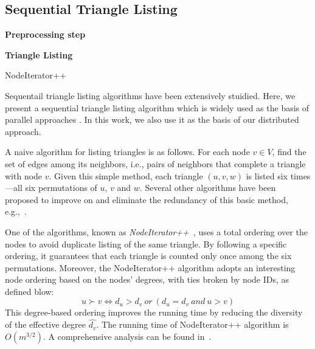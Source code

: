 \subsection{Sequential Triangle Listing}
\label{sec:InMemoryAlgorithms}
\begin{algorithm}[t]
    \begin{algorithmic}[1]
        \item[] {\textbf{Preprocessing step}} 
         \ENDFOR
        \item[] {\textbf{Triangle Listing}}
                 \ENDFOR
            \ENDFOR
        \ENDFOR
    \caption{NodeIterator++}
    \label{alg:Node}
    \end{algorithmic}
\end{algorithm}
Sequentail triangle listing algorithms have been extensively stuidied. Here, we present a sequential triangle listing algorithm which is widely used as the basis of parallel approaches \cite{Suri_Vassilvitskii_2011,Patric,parkmapreduce2014}. In this work, we also use it as the basis of our distributed approach. 

A naive algorithm for listing triangles is as follows. For each node $v \in V$, find the set of edges among its neighbors, i.e., pairs of neighbors that complete a triangle with node $v$. Given  this simple method, each triangle $(u,v,w)$ is listed six times---all six permutations of $u$, $v$ and $w$. Several other algorithms have been proposed to improve on and eliminate the redundancy of this basic method, e.g.,~\cite{Schank_2007,Becchetti_Boldi_Castillo_Gionis_2008}.

One of the algorithms, known as \emph{NodeIterator++}~\cite{Schank_2007}, uses a total ordering over the nodes to avoid duplicate listing of the same triangle. By following a specific ordering, it guarantees  that each triangle is counted only once among the six permutations. Moreover, the NodeIterator++ algorithm  adopts an interesting node ordering based on the nodes'  degrees, with ties broken by node IDs, as defined blow: 
\begin{equation*}
    u \succ v \Longleftrightarrow d_u > d_v ~or~(d_u=d_v ~and ~u>v)
    \label{eq:totalOrder}
\end{equation*}
This degree-based ordering improves the running time by reducing the diversity of the effective degree $\hat{d_v}$. The running time of NodeIterator++ algorithm is $O(m^{3/2})$. A comprehensive analysis  can be found in~\cite{Schank_2007}.

